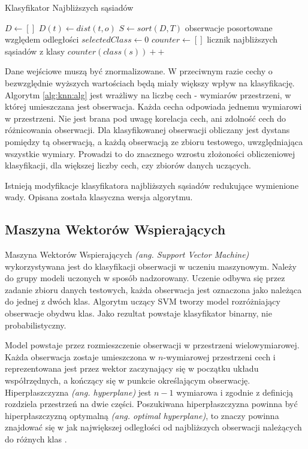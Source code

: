 \documentclass[a4paper,12pt,twoside,openany]{report}
\newcommand{\ang}[1]{\textit{(ang. #1)}}
\begin{document}
\begin{algorithm}
	\caption{Klasyfikator Najbliższych sąsiadów}
	\begin{algorithmic}[1]
		\State $D \leftarrow []$
		\State $D(t) \leftarrow dist(t, o)$
		\EndFor
		\State $S \leftarrow sort(D, T)$ \Comment obserwacje posortowane względem odległości
		\State $selectedClass \leftarrow 0$
		\State $counter \leftarrow []$ \Comment licznik najbliższych sąsiadów z klasy
		\Repeat
		\State $counter(class(s))++$
		\EndFor
		\EndProcedure
	\end{algorithmic}
	\label{alg:knn:alg}
\end{algorithm}

Dane wejściowe muszą być znormalizowane. 
W przeciwnym razie cechy o bezwzględnie wyższych wartościach będą miały większy wpływ na klasyfikację.
Algorytm \ref{alg:knn:alg} jest wrażliwy na liczbę cech - wymiarów przestrzeni, w której umieszczana jest obserwacja.
Każda cecha odpowiada jednemu wymiarowi w przestrzeni.
Nie jest brana pod uwagę korelacja cech, ani zdolność cech do różnicowania obserwacji.
Dla klasyfikowanej obserwacji obliczany jest dystans pomiędzy tą obserwacją,
a każdą obserwacją ze zbioru testowego, uwzględniająca wszystkie wymiary.
Prowadzi to do znacznego wzrostu złożoności obliczeniowej klasyfikacji, dla większej liczby cech, czy zbiorów danych uczących.

Istnieją modyfikacje klasyfikatora najbliższych sąsiadów redukujące wymienione wady. 
Opisana została klasyczna wersja algorytmu.

\subsection{Maszyna Wektorów Wspierających}

Maszyna Wektorów Wspierających \ang{Support Vector Machine} wykorzystywana jest do klasyfikacji obserwacji w uczeniu maszynowym.
Należy do grupy modeli uczonych w sposób nadzorowany. 
Uczenie odbywa się przez zadanie zbioru danych testowych, 
każda obserwacja jest oznaczona jako należąca do jednej z dwóch klas.
Algorytm uczący SVM tworzy model rozróżniający obserwacje obydwu klas.
Jako rezultat powstaje klasyfikator binarny, nie probabilistyczny. 

Model powstaje przez rozmieszczenie obserwacji w przestrzeni wielowymiarowej.
Każda obserwacja zostaje umieszczona w $n$-wymiarowej przestrzeni cech i reprezentowana jest przez wektor
zaczynający się w początku układu współrzędnych, a kończący się w punkcie określającym obserwację. 
Hiperpłaszczyzna \ang{hyperplane} jest $n-1$ wymiarowa i zgodnie z definicją rozdziela przestrzeń na dwie części.
Poszukiwana hiperpłaszczyzna powinna być hiperpłaszczyzną optymalną \ang{optimal hyperplane}, 
to znaczy powinna znajdować się w jak największej odległości od najbliższych obserwacji należących do różnych klas \cite{Cortes1995}.
\end{document}
